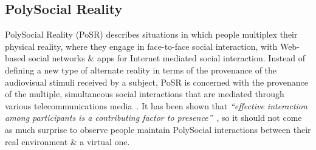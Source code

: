 









\subsection{PolySocial Reality}

PolySocial Reality (PoSR) describes situations in which people multiplex their physical reality, where they engage in face-to-face social interaction, with Web-based social networks \& apps for Internet mediated social interaction. Instead of defining a new type of alternate reality in terms of the provenance of the audiovisual stimuli received by a subject, PoSR is concerned with the provenance of the multiple, simultaneous social interactions that are mediated through various telecommunications media~\cite{Applin2012}. It has been shown that \textit{``effective interaction among participants is a contributing factor to presence''}~\cite{Terashima2001}, so it should not come as much surprise to observe people maintain PolySocial interactions between their real environment \& a virtual one.

